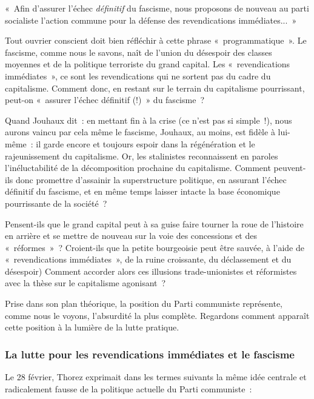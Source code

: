 \documentclass[french,twoside]{book} %
\newenvironment{quoteblock}%
  {\begin{quoting}}
  {\end{quoting}}
\newenvironment{quotebar}{%
    \def\FrameCommand{{\color{rubric!10!}\vrule width 0.5em} \hspace{0.9em}}%
    \def\OuterFrameSep{\itemsep} %
    \MakeFramed {\advance\hsize-\width \FrameRestore}
  }%
  {%
    \endMakeFramed
  }
\renewenvironment{quoteblock}%
  {%
    \savenotes
    \setstretch{0.9}
    \normalfont
    \begin{quotebar}
  }
  {%
    \end{quotebar}
    \spewnotes
  }
\begin{document}
\begin{quoteblock}
 \noindent « Afin d’assurer l’échec \emph{définitif} du fascisme, nous proposons de nouveau au parti socialiste  l’action commune pour la défense des revendications immédiates... »
 \end{quoteblock}

\noindent Tout ouvrier conscient doit bien réfléchir à cette phrase « programmatique ». Le fascisme, comme nous le savons, naît de l’union du désespoir des classes moyennes et de la politique terroriste du grand capital. Les « revendications immédiates », ce sont les revendications qui ne sortent pas du cadre du capitalisme. Comment donc, en restant sur le terrain du capitalisme pourrissant, peut-on « assurer l’échec définitif (!) » du fascisme ?\par
Quand Jouhaux dit : en mettant fin à la crise (ce n’est pas si simple !), nous aurons vaincu par cela même le fascisme, Jouhaux, au moins, est fidèle à lui-même : il garde encore et toujours espoir dans la régénération et le rajeunissement du capitalisme. Or, les stalinistes reconnaissent en paroles l’inéluctabilité de la décomposition prochaine du capitalisme. Comment peuvent-ils donc promettre d’assainir la superstructure politique, en assurant l’échec définitif du fascisme, et en même temps laisser intacte la base économique pourrissante de la société ?\par
Pensent-ils que le grand capital peut à sa guise faire tourner la roue de l’histoire en arrière et se mettre de nouveau sur la voie des concessions et des « réformes » ? Croient-ils que la petite bourgeoisie peut être sauvée, à l’aide de « revendications immédiates », de la ruine croissante, du déclassement et du désespoir) Comment accorder alors ces illusions trade-unionistes et réformistes avec la thèse sur le capitalisme agonisant ?\par
Prise dans son plan théorique, la position du Parti communiste représente, comme nous le voyons, l’absurdité la plus complète. Regardons comment apparaît cette position à la lumière de la lutte pratique.
 \subsubsection[{La lutte pour les revendications immédiates et le fascisme}]{La lutte pour les revendications immédiates et le fascisme}
\noindent Le 28 février, Thorez exprimait dans les termes suivants la même idée centrale et radicalement fausse de la politique actuelle du Parti communiste :\par
\end{document}
